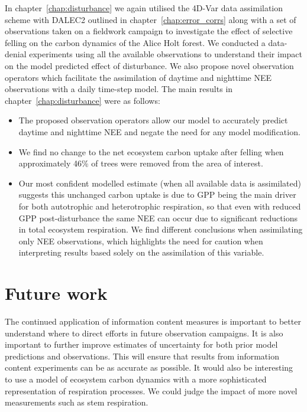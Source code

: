 In chapter~\ref{chap:disturbance} we again utilised the 4D-Var data assimilation scheme with DALEC2 outlined in chapter~\ref{chap:error_corrs} along with a set of observations taken on a fieldwork campaign to investigate the effect of selective felling on the carbon dynamics of the Alice Holt forest. We conducted a data-denial experiments using all the available observations to understand their impact on the model predicted effect of disturbance. We also propose novel observation operators which facilitate the assimilation of daytime and nighttime NEE observations with a daily time-step model. The main results in chapter~\ref{chap:disturbance} were as follows:
\begin{itemize}
\item The proposed observation operators allow our model to accurately predict daytime and nighttime NEE and negate the need for any model modification. 
\item We find no change to the net ecosystem carbon uptake after felling when approximately 46\% of trees were removed from the area of interest.
\item Our most confident modelled estimate (when all available data is assimilated) suggests this unchanged carbon uptake is due to GPP being the main driver for both autotrophic and heterotrophic respiration, so that even with reduced GPP post-disturbance the same NEE can occur due to significant reductions in total ecosystem respiration. We find different conclusions when assimilating only NEE observations, which highlights the need for caution when interpreting results based solely on the assimilation of this variable. 
\end{itemize}

\section{Future work}

The continued application of information content measures is important to better understand where to direct efforts in future observation campaigns. It is also important to further improve estimates of uncertainty for both prior model predictions and observations. This will ensure that results from information content experiments can be as accurate as possible. It would also be interesting to use a model of ecosystem carbon dynamics with a more sophisticated representation of respiration processes. We could judge the impact of more novel measurements such as stem respiration.

